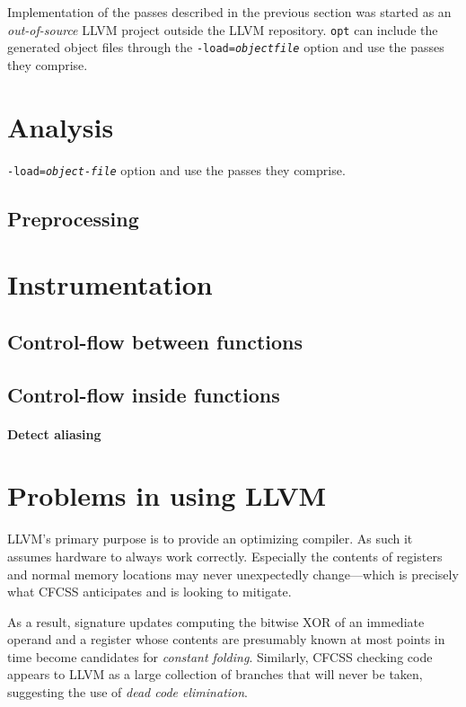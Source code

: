 Implementation of the passes described in the previous section was started as
an \emph{out-of-source} LLVM
project outside the LLVM repository. \texttt{opt} can include the generated
object files through the \texttt{-load=\textit{objectfile}} option and use the
passes they comprise.

\section{Analysis}

\texttt{-load=\textit{object-file}} option and use the passes they comprise.

\subsection{Preprocessing}


\section{Instrumentation}


\subsection{Control-flow between functions}


\subsection{Control-flow inside functions}


\paragraph{Detect aliasing}


\section{Problems in using LLVM}

LLVM's primary purpose is to provide an optimizing compiler. As such it assumes
hardware to always work correctly. Especially the contents of registers and
normal memory locations may never unexpectedly change—which is precisely what
CFCSS anticipates and is looking to mitigate.

As a result, signature updates computing the bitwise XOR of an immediate
operand and a register whose contents are presumably known at most points in
time become candidates for \emph{constant folding}. Similarly, CFCSS checking
code appears to LLVM as a large collection of branches that will never be
taken, suggesting the use of \emph{dead code elimination}.

